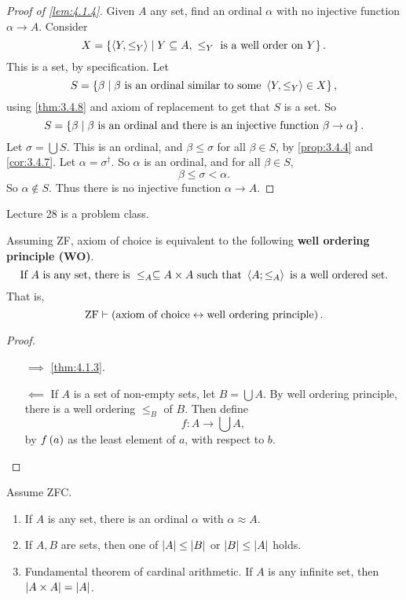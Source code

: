 \begin{proof}[Proof of \ref{lem:4.1.4}]
Given $ A $ any set, find an ordinal $ \alpha $ with no injective function $ \alpha \to A $. Consider
$$ X = \left\{ \left\langle Y, \le_Y \right\rangle \mid Y \subseteq A, \ \le_Y \ \text{is a well order on} \ Y \right\}. $$
This is a set, by specification. Let
$$ S = \left\{ \beta \mid \beta \ \text{is an ordinal similar to some} \ \left\langle Y, \le_Y \right\rangle \in X \right\}, $$
using \ref{thm:3.4.8} and axiom of replacement to get that $ S $ is a set. So
$$ S = \cb{\beta \mid \beta \ \text{is an ordinal and there is an injective function} \ \beta \to \alpha}. $$
Let $ \sigma = \bigcup S $. This is an ordinal, and $ \beta \le \sigma $ for all $ \beta \in S $, by \ref{prop:3.4.4} and \ref{cor:3.4.7}. Let $ \alpha = \sigma^\dagger $. So $ \alpha $ is an ordinal, and for all $ \beta \in S $,
$$ \beta \le \sigma < \alpha. $$
So $ \alpha \notin S $. Thus there is no injective function $ \alpha \to A $.
\end{proof}


Lecture 28 is a problem class.


\begin{corollary}
Assuming ZF, axiom of choice is equivalent to the following \textbf{well ordering principle (WO)}.
$$ \text{If} \ A \ \text{is any set, there is} \ \le_A \subseteq A \times A \ \text{such that} \ \ab{A; \le_A} \ \text{is a well ordered set}. $$
That is,
$$ \text{ZF} \vdash \left( \text{axiom of choice} \leftrightarrow \text{well ordering principle} \right). $$
\end{corollary}

\begin{proof}
\hfill
\begin{itemize}
\item[$ \implies $] \ref{thm:4.1.3}.
\item[$ \impliedby $] If $ A $ is a set of non-empty sets, let $ B = \bigcup A $. By well ordering principle, there is a well ordering $ \le_B $ of $ B $. Then define
$$ f : A \to \bigcup A, $$
by $ f\left( a \right) $ as the least element of $ a $, with respect to $ b $.
\end{itemize}
\end{proof}

\begin{corollary}
\label{cor:4.1.6}
Assume ZFC.
\begin{enumerate}
\item If $ A $ is any set, there is an ordinal $ \alpha $ with $ \alpha \approx A $.
\item If $ A, B $ are sets, then one of $ \left\lvert A \right\rvert \le \left\lvert B \right\rvert $ or $ \left\lvert B \right\rvert \le \left\lvert A \right\rvert $ holds.
\item Fundamental theorem of cardinal arithmetic. If $ A $ is any infinite set, then $ \left\lvert A \times A \right\rvert = \left\lvert A \right\rvert $.
\end{enumerate}
\end{corollary}

